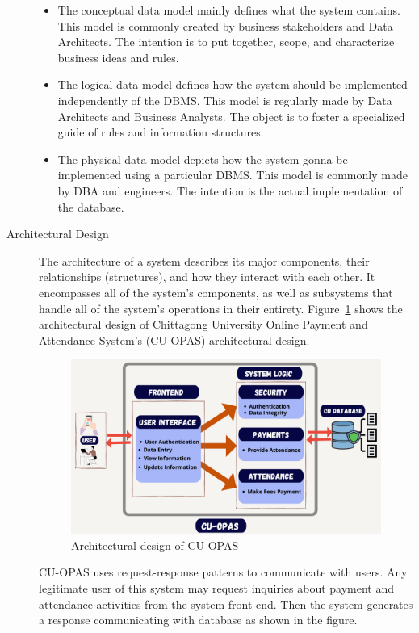 \begin{description}
\begin{itemize}
  \item The conceptual data model mainly defines what the system contains. This model is commonly created by business stakeholders and Data Architects. The intention is to put together, scope, and characterize business ideas and rules.
  \item The logical data model defines how the system should be implemented independently of the DBMS. This model is regularly made by Data Architects and Business Analysts. The object is to foster a specialized guide of rules and information structures.
  \item The physical data model depicts how the system gonna be implemented using a particular DBMS. This model is commonly made by DBA and engineers. The intention is the actual implementation of the database.
\end{itemize}
\item[Architectural Design] The architecture of a system describes its major components, their relationships (structures), and how they interact with each other. It encompasses all of the system's components, as well as subsystems that handle all of the system's operations in their entirety. Figure~\ref{fig:archi} shows the architectural design of Chittagong University Online Payment and Attendance System's (CU-OPAS) architectural design.

\begin{figure}[H]
    \centering
    \includegraphics[width=1\textwidth]{images/archi}
    \caption{Architectural design of CU-OPAS}
    \label{fig:archi}
\end{figure}

CU-OPAS uses request-response patterns to communicate with users. Any legitimate user of this system may request inquiries about payment and attendance activities from the system front-end. Then the system generates a response communicating with database as shown in the figure.


\end{description}
